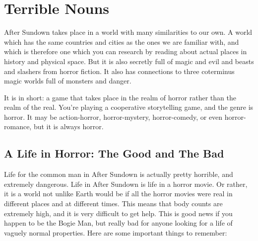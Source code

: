 \chapter{Terrible Nouns}

After Sundown takes place in a world with many similarities to our own. A world which has the same countries and cities as the ones we are familiar with, and which is therefore one which you can research by reading about actual places in history and physical space. But it is also secretly full of magic and evil and beasts and slashers from horror fiction. It also has connections to three coterminus magic worlds full of monsters and danger.

It is in short: a game that takes place in the realm of horror rather than the realm of the real. You're playing a cooperative storytelling game, and the genre is horror. It may be action-horror, horror-mystery, horror-comedy, or even horror-romance, but it is always horror.

\section[A Life In Horror]{A Life in Horror: The Good and The Bad}

Life for the common man in After Sundown is actually pretty horrible, and extremely dangerous. Life in After Sundown is life in a horror movie. Or rather, it is a world not unlike Earth would be if all the horror movies were real in different places and at different times. This means that body counts are extremely high, and it is very difficult to get help. This is good news if you happen to be the Bogie Man, but really bad for anyone looking for a life of vaguely normal properties. Here are some important things to remember:

